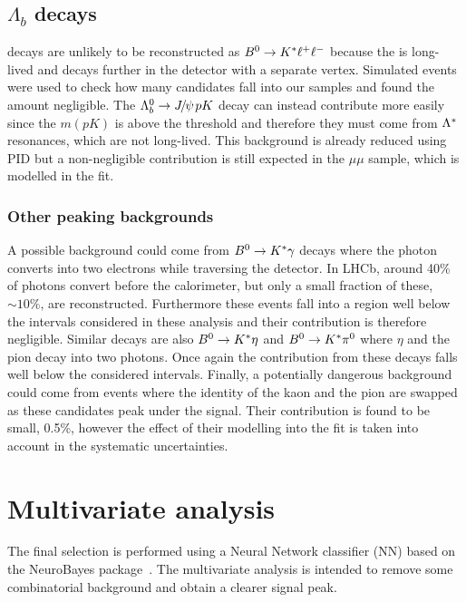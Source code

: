 \subsection{$\Lambda_b$ decays}

\Lb\to\Lz\jpsi decays are unlikely to be reconstructed as ${{B}^0} \rightarrow {\ensuremath{{K}^*}} \ell^+\ell^-$ because
the \Lz is long-lived and decays further in the detector with a separate vertex.
Simulated events were used to check how many candidates fall into our \Bz samples and found the amount negligible. 
The $\Lb\to\jpsi pK$ decay can instead contribute more easily since the $m(pK)$ is above the \Lz threshold
and therefore they must come from ${\Lambda}^*$ resonances, which are not long-lived. This background is already
reduced using PID but a non-negligible contribution is still expected in the $\mu\mu$ sample, which is modelled in the fit.

\subsubsection{Other peaking backgrounds}

A possible background could come from ${{B}^0} \rightarrow{\ensuremath{{K}^*}}\gamma$ decays where the photon converts
into two electrons while traversing the detector. In LHCb, around 40\% of photons convert before the calorimeter,
but only a small fraction of these, $\sim 10\%$, are reconstructed. Furthermore these events fall
into a \qsq region well below the intervals considered in these analysis and their contribution is therefore negligible.
Similar decays are also $\Bz \to\Kstar\eta$ and $\Bz \to\Kstar\pi^0$ where $\eta$ and the pion decay into
two photons. Once again the contribution from these decays falls well below the considered \qsq intervals.
Finally, a potentially dangerous background could come from events where the
identity of the kaon and the pion are swapped as these candidates peak under the signal.
Their contribution is found to be small, 0.5\%, however the effect of their modelling into the fit
is taken into account in the systematic uncertainties.


\section{Multivariate analysis}

The final selection is performed using a Neural Network classifier (NN) based on the NeuroBayes
package~\cite{Feindt:2006pm,feindt-2004}. The multivariate analysis is intended to remove
some combinatorial background and obtain a clearer signal peak.

